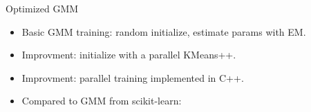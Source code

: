 \begin{frame}{Optimized GMM}
  \begin{itemize}
    \item Basic GMM training: random initialize, estimate params with EM.
    \item Improvment: initialize with a parallel KMeans++.
    \item Improvment: parallel training implemented in C++.
    \item Compared to GMM from scikit-learn:
  \end{itemize}

  \begin{columns}
    \begin{column}{0.5\textwidth}
      \begin{center}
      \end{center}
      \vspace{0.6em}
    \end{column}
    \begin{column}{0.6\textwidth}
    \end{column}
  \end{columns}
  \vspace{2em}


\end{frame}
